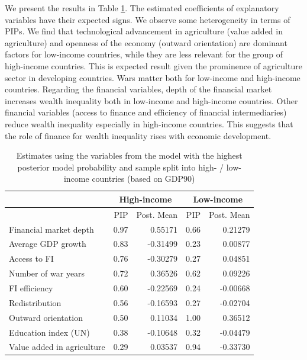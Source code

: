 \documentclass[a4paper,11pt]{article}
\begin{document}
We present the results in Table \ref{tab:inc_comparison}. The estimated coefficients of explanatory variables have their expected signs. We observe some heterogeneity in terms of PIPs. We find that technological advancement in agriculture (value added in agriculture) and openness of the economy (outward orientation) are dominant factors for low-income countries, while they are less relevant for the group of high-income countries. This is expected result given the prominence of agriculture sector in developing countries. Wars matter both for low-income and high-income countries. Regarding the financial variables, depth of the financial market increases wealth inequality both in low-income and high-income countries. Other financial variables (access to finance and efficiency of financial intermediaries) reduce wealth inequality especially in high-income countries. This suggests that the role of finance for wealth inequality rises with economic development.  

\begin{table}[htbp!]
\caption{Estimates using the variables from the model with the highest posterior model probability and sample split into high- / low- income countries (based on GDP90)}
\label{tab:inc_comparison}
\centering
\begin{tabular}{lrrrr}
  \toprule
  & \multicolumn{2}{c}{High-income} & \multicolumn{2}{c}{Low-income} \\
  \midrule
	 & PIP & Post. Mean & PIP & Post. Mean \\ 
  \midrule
  Financial market depth & 0.97 & 0.55171 & 0.66 & 0.21279 \\ 
  Average GDP growth & 0.83 & -0.31499 & 0.23 & 0.00877 \\ 
  Access to FI & 0.76 & -0.30279 & 0.27 & 0.04851 \\ 
  Number of war years & 0.72 & 0.36526 & 0.62 & 0.09226 \\ 
  FI efficiency & 0.60 & -0.22569 & 0.24 & -0.00668 \\ 
  Redistribution & 0.56 & -0.16593 & 0.27 & -0.02704 \\ 
  Outward orientation & 0.50 & 0.11034 & 1.00 & 0.36512 \\ 
  Education index (UN) & 0.38 & -0.10648 & 0.32 & -0.04479 \\ 
  Value added in agriculture & 0.29 & 0.03537 & 0.94 & -0.33730 \\ 
   \bottomrule
\end{tabular}
\end{table}
\end{document}
